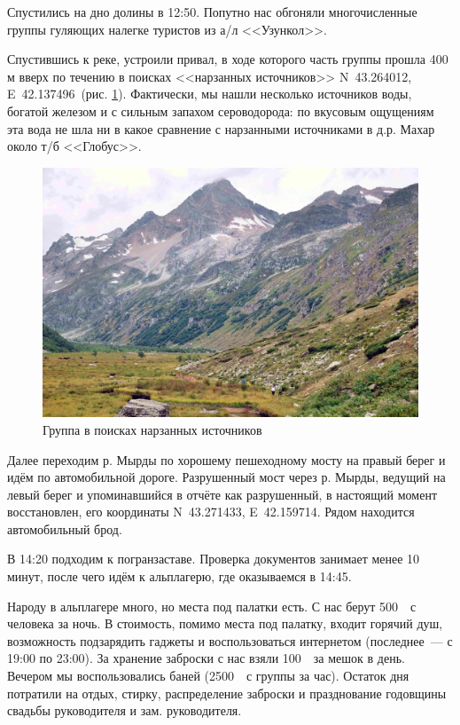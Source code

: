 Спустились на дно долины в 12:50. Попутно нас обгоняли многочисленные группы гуляющих налегке туристов из а/л <<Узункол>>.

Спустившись к реке, устроили привал, в ходе которого часть группы прошла 400 м вверх по течению в поисках <<нарзанных источников>> N~43.264012\degree, E~42.137496\degree~(рис. \ref{fig:DSC_0111.JPG}). Фактически, мы нашли несколько источников воды, богатой железом и с сильным запахом сероводорода: по вкусовым ощущениям эта вода не шла ни в какое сравнение с нарзанными источниками в д.р. Махар около т/б <<Глобус>>.

\begin{figure}[h!]
	\centering
	\includegraphics[width=0.7\linewidth]{../pics/DSC_0111.JPG}
	\caption{Группа в поисках нарзанных источников}
	\label{fig:DSC_0111.JPG}
\end{figure}

Далее переходим р. Мырды по хорошему пешеходному мосту на правый берег и идём по автомобильной дороге. Разрушенный мост через р. Мырды, ведущий на левый берег и упоминавшийся в отчёте \cite{Korolyov2018} как разрушенный, в настоящий момент восстановлен, его координаты N~43.271433\degree, E~42.159714\degree. Рядом находится автомобильный брод.

В 14:20 подходим к погранзаставе. Проверка документов занимает менее 10 минут, после чего идём к альплагерю, где оказываемся в 14:45.

Народу в альплагере много, но места под палатки есть. С нас берут 500~\faRub~с человека за ночь. В стоимость, помимо места под палатку, входит горячий душ, возможность подзарядить гаджеты и воспользоваться интернетом (последнее~--- с 19:00 по 23:00). За хранение заброски с нас взяли 100~\faRub~за мешок в день. Вечером мы воспользовались баней (2500~\faRub~с группы за час). Остаток дня потратили на отдых, стирку, распределение заброски и празднование годовщины свадьбы руководителя и зам. руководителя.

\clearpage